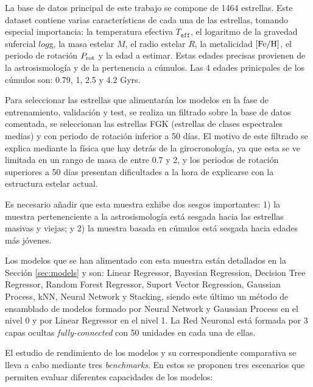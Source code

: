 \vspace{0.5cm}

La base de datos principal de este trabajo se compone de 1464 estrellas. Este dataset contiene varias características de cada una de las estrellas, tomando especial importancia: la temperatura efectiva $T_\texttt{eff}$, el logaritmo de la gravedad sufercial $log$g, la masa estelar $M$, el radio estelar $R$, la metalicidad ${\rm [Fe/H]}$, el periodo de rotación $P_{\rm rot}$ y la edad a estimar. Estas edades precisas provienen de la astrosismología y de la pertenencia a cúmulos. Las 4 edades prinicpales de los cúmulos son: 0.79, 1, 2.5 y 4.2 Gyrs.

Para seleccionar las estrellas que alimentarán los modelos en la fase de entrenamiento, validación y test, se realiza un filtrado sobre la base de datos comentada, se seleccionan las estrellas FGK (estrellas de clases espectrales medias) y con periodo de rotación inferior a 50 días. El motivo de este filtrado se explica mediante la física que hay detrás de la girocronología, ya que esta se ve limitada en un rango de masa de entre 0.7 y 2, y los periodos de rotación superiores a 50 días presentan dificultades a la hora de explicarse con la estructura estelar actual.

Es necesario añadir que esta muestra exhibe dos sesgos importantes: 1) la muestra pertenenciente a la astrosismología está sesgada hacia las estrellas masivas y viejas; y 2) la muestra basada en cúmulos está sesgada hacia edades más jóvenes.

\vspace{0.5cm}

Los modelos que se han alimentado con esta muestra están detallados en la Sección \ref{sec:models} y son: Linear Regressor, Bayesian Regression, Decision Tree Regressor, Random Forest Regressor, Suport Vector Regression, Gaussian Process, kNN, Neural Network y Stacking, siendo este último un método de ensamblado de modelos formado por Neural Network y Gaussian Process en el nivel 0 y por Linear Regressor en el nivel 1. La Red Neuronal está formada por 3 capas ocultas \emph{fully-connected} con 50 unidades en cada una de ellas.

El estudio de rendimiento de los modelos y su correspondiente comparativa se lleva a cabo mediante tres \emph{benchmarks}. En estos se proponen tres escenarios que permiten evaluar diferentes capacidades de los modelos:

\vspace{0.25cm}

